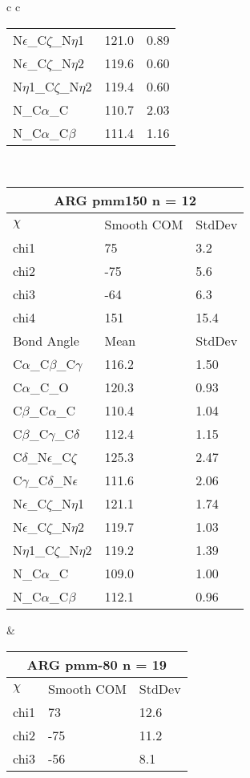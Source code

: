 \begin{longtable}{ c c }
\begin{tabular}{ l l l }
  N$\epsilon$\_C$\zeta$\_N$\eta$1 & 121.0 & 0.89\\
  N$\epsilon$\_C$\zeta$\_N$\eta$2 & 119.6 & 0.60\\
  N$\eta$1\_C$\zeta$\_N$\eta$2 & 119.4 & 0.60\\
  N\_C$\alpha$\_C & 110.7 & 2.03\\
  N\_C$\alpha$\_C$\beta$ & 111.4 & 1.16\\
  \bottomrule
  \end{tabular}
  \\
  \begin{tabular}{ l l l }
  \toprule
  \multicolumn{3}{c}{ARG \textbf{pmm150} n = 12} \\ \toprule
  $\chi$       & Smooth COM & StdDev \\ \midrule
  chi1 & 75 & 3.2 \\ 
  chi2 & -75 & 5.6 \\ 
  chi3 & -64 & 6.3 \\ 
  chi4 & 151 & 15.4 \\ \midrule
  Bond Angle   & Mean     & StdDev \\ \midrule
  C$\alpha$\_C$\beta$\_C$\gamma$ & 116.2 & 1.50\\
  C$\alpha$\_C\_O & 120.3 & 0.93\\
  C$\beta$\_C$\alpha$\_C & 110.4 & 1.04\\
  C$\beta$\_C$\gamma$\_C$\delta$ & 112.4 & 1.15\\
  C$\delta$\_N$\epsilon$\_C$\zeta$ & 125.3 & 2.47\\
  C$\gamma$\_C$\delta$\_N$\epsilon$ & 111.6 & 2.06\\
  N$\epsilon$\_C$\zeta$\_N$\eta$1 & 121.1 & 1.74\\
  N$\epsilon$\_C$\zeta$\_N$\eta$2 & 119.7 & 1.03\\
  N$\eta$1\_C$\zeta$\_N$\eta$2 & 119.2 & 1.39\\
  N\_C$\alpha$\_C & 109.0 & 1.00\\
  N\_C$\alpha$\_C$\beta$ & 112.1 & 0.96\\
  \bottomrule
  \end{tabular}
  &
  \begin{tabular}{ l l l }
  \toprule
  \multicolumn{3}{c}{ARG \textbf{pmm-80} n = 19} \\ \toprule
  $\chi$       & Smooth COM & StdDev \\ \midrule
  chi1 & 73 & 12.6 \\ 
  chi2 & -75 & 11.2 \\ 
  chi3 & -56 & 8.1 \\ 

\end{tabular}
\end{longtable}
